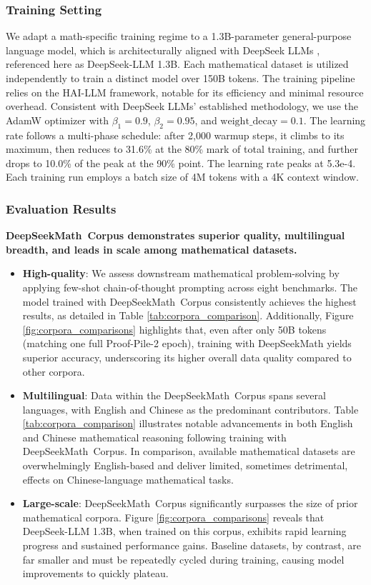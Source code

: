 \subsubsection{Training Setting}
\label{sec:quality-policy}
We adapt a math-specific training regime to a 1.3B-parameter general-purpose language model, which is architecturally aligned with DeepSeek LLMs \citep{deepseek-llm}, referenced here as DeepSeek-LLM 1.3B. Each mathematical dataset is utilized independently to train a distinct model over 150B tokens. The training pipeline relies on the HAI-LLM \citep{haillm} framework, notable for its efficiency and minimal resource overhead. Consistent with DeepSeek LLMs' established methodology, we use the AdamW optimizer \citep{adamW} with $\beta_1=0.9$, $\beta_2=0.95$, and $\mathrm{weight\_decay}=0.1$. The learning rate follows a multi-phase schedule: after 2,000 warmup steps, it climbs to its maximum, then reduces to 31.6\% at the 80\% mark of total training, and further drops to 10.0\% of the peak at the 90\% point. The learning rate peaks at 5.3e-4. Each training run employs a batch size of 4M tokens with a 4K context window.

\subsubsection{Evaluation Results}

\textbf{DeepSeekMath~Corpus demonstrates superior quality, multilingual breadth, and leads in scale among mathematical datasets.}

\begin{itemize}[topsep=0pt]
    \item \textbf{High-quality}:
    We assess downstream mathematical problem-solving by applying few-shot chain-of-thought prompting \cite{cot} across eight benchmarks. The model trained with DeepSeekMath~Corpus consistently achieves the highest results, as detailed in Table \ref{tab:corpora_comparison}. Additionally, Figure \ref{fig:corpora_comparisons} highlights that, even after only 50B tokens (matching one full Proof-Pile-2 epoch), training with DeepSeekMath yields superior accuracy, underscoring its higher overall data quality compared to other corpora.
    \item \textbf{Multilingual}:
    Data within the DeepSeekMath~Corpus spans several languages, with English and Chinese as the predominant contributors. Table \ref{tab:corpora_comparison} illustrates notable advancements in both English and Chinese mathematical reasoning following training with DeepSeekMath~Corpus. In comparison, available mathematical datasets are overwhelmingly English-based and deliver limited, sometimes detrimental, effects on Chinese-language mathematical tasks.
    \item \textbf{Large-scale}:
    DeepSeekMath~Corpus significantly surpasses the size of prior mathematical corpora. Figure \ref{fig:corpora_comparisons} reveals that DeepSeek-LLM 1.3B, when trained on this corpus, exhibits rapid learning progress and sustained performance gains. Baseline datasets, by contrast, are far smaller and must be repeatedly cycled during training, causing model improvements to quickly plateau.
\end{itemize}

